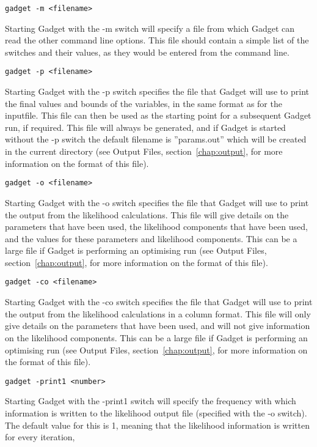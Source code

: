 \documentclass [a4paper, 10pt]{book}
\begin{document}
{\small\begin{verbatim}
gadget -m <filename>
\end{verbatim}}
Starting Gadget with the -m switch will specify a file from which Gadget can read the other command line options.  This file should contain a simple list of the switches and their values, as they would be entered from the command line.

{\small\begin{verbatim}
gadget -p <filename>
\end{verbatim}}
Starting Gadget with the -p switch specifies the file that Gadget will use to print the final values and bounds of the variables, in the same format as for the inputfile.  This file can then be used as the starting point for a subsequent Gadget run, if required.  This file will always be generated, and if Gadget is started without the -p switch the default filename is ''params.out'' which will be created in the current directory (see Output Files, section~\ref{chap:output}, for more information on the format of this file).

{\small\begin{verbatim}
gadget -o <filename>
\end{verbatim}}
Starting Gadget with the -o switch specifies the file that Gadget will use to print the output from the likelihood calculations.  This file will give details on the parameters that have been used, the likelihood components that have been used, and the values for these parameters and likelihood components.  This can be a large file if Gadget is performing an optimising run (see Output Files, section~\ref{chap:output}, for more information on the format of this file).

\newpage %
{\small\begin{verbatim}
gadget -co <filename>
\end{verbatim}}
Starting Gadget with the -co switch specifies the file that Gadget will use to print the output from the likelihood calculations in a column format.  This file will only give details on the parameters that have been used, and will not give information on the likelihood components.  This can be a large file if Gadget is performing an optimising run (see Output Files, section~\ref{chap:output}, for more information on the format of this file).

{\small\begin{verbatim}
gadget -print1 <number>
\end{verbatim}}
Starting Gadget with the -print1 switch will specify the frequency with which information is written to the likelihood output file (specified with the -o switch).  The default value for this is 1, meaning that the likelihood information is written for every iteration,
\end{document}

